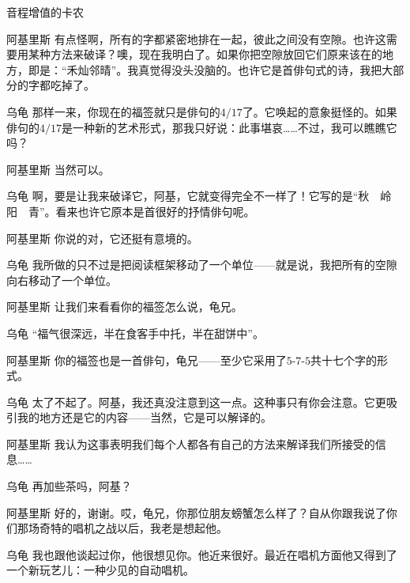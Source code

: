 \begin{dialog}{音程增值的卡农}
\begin{dialogue}
\item[阿基里斯]有点怪啊，所有的字都紧密地排在一起，彼此之间没有空隙。也许这需要用某种方法来破译？噢，现在我明白了。如果你把空隙放回它们原来该在的地方，即是：“{禾灿邻晴}”。我真觉得没头没脑的。也许它是首俳句式的诗，我把大部分的字都吃掉了。

\item[乌龟]那样一来，你现在的福签就只是俳句的$4/17$了。它唤起的意象挺怪的。如果俳句的$4/17$是一种新的艺术形式，那我只好说：此事堪哀……不过，我可以瞧瞧它吗？

\item[阿基里斯]当然可以。

\item[乌龟]啊，要是让我来破译它，阿基，它就变得完全不一样了！它写的是“秋　岭　阳　青”。看来也许它原本是首很好的抒情俳句呢。

\item[阿基里斯]你说的对，它还挺有意境的。

\item[乌龟]我所做的只不过是把阅读框架移动了一个单位——就是说，我把所有的空隙向右移动了一个单位。

\item[阿基里斯]让我们来看看你的福签怎么说，龟兄。

\item[乌龟]“福气很深远，半在食客手中托，半在甜饼中”。

\item[阿基里斯]你的福签也是一首俳句，龟兄——至少它采用了$5$-$7$-$5$共十七个字的形式。

\item[乌龟]太了不起了。阿基，我还真没注意到这一点。这种事只有你会注意。它更吸引我的地方还是它的内容——当然，它是可以解译的。

\item[阿基里斯]我认为这事表明我们每个人都各有自己的方法来解译我们所接受的信息……


\item[乌龟]再加些茶吗，阿基？

\item[阿基里斯]好的，谢谢。哎，龟兄，你那位朋友螃蟹怎么样了？自从你跟我说了你们那场奇特的唱机之战以后，我老是想起他。

\item[乌龟]我也跟他谈起过你，他很想见你。他近来很好。最近在唱机方面他又得到了一个新玩艺儿：一种少见的自动唱机。


\end{dialogue}
\end{dialog}
